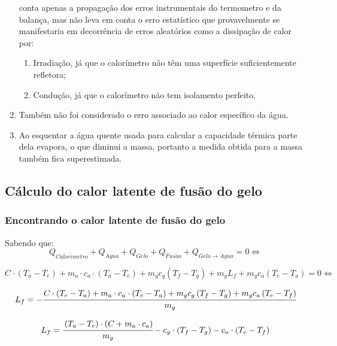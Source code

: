 \documentclass[a4paper]{article}
\begin{document}
\begin{enumerate}
					conta apenas a propagação dos erros instrumentais do termometro e
					da balança, mas não leva em conta o erro estatístico que provavelmente
					se manifestaria em decorrência de erros aleatórios como a dissipação
					de calor por: 
						\begin{enumerate}
							\item Irradiação, já que o calorímetro não têm uma superfície suficientemente
							refletora; 
							\item Condução, já que o calorímetro não tem isolamento perfeito. 
						\end{enumerate}
					\item Também não foi considerado o erro associado ao calor específico da
					água. 
					\item Ao esquentar a água quente usada para calcular a capacidade térmica
					parte dela evapora, o que diminui a massa, portanto a medida obtida
					para a massa também fica superestimada. 
				\end{enumerate}

		\subsection{Cálculo do calor latente de fusão do gelo}

			\subsubsection{Encontrando o calor latente de fusão do gelo}

				Sabendo que: 
				\begin{equation}
					Q_{Calor\acute{i}metro}+
					Q_{\acute{A}gua}+Q_{Gelo}+
					Q_{Fus\tilde{a}o}+Q_{Gelo\rightarrow\acute{A}gua}=0 
					\Leftrightarrow
				\end{equation}


				\[
					C\cdot\left(T_{a}-T_{e}\right)+
					m_{a}\cdot c_{a}\cdot\left(T_{a}-T_{e}\right)+
					m_{g}c_{g}\left(T_{f}-T_{g}\right)+m_{g}L_{f}+
					m_{g}c_{a}\left(T_{e}-T_{a}\right)=0
					\Leftrightarrow
				\]


				\[
					L_{f} = - \cfrac{
										C\cdot\left(T_{e}-T_{a}\right)+
										m_{a}\cdot c_{a}\cdot\left(T_{e}-T_{a}\right)+
										m_{g}c_{g}\left(T_{f}-T_{g}\right)+
										m_{g}c_{a}\left(T_{e}-T_{f}\right)
									}
									{m_{g}}
				\]


				\begin{equation}
					L_{f} = \cfrac{\left(T_{a}-T_{e}\right)\cdot\left(C+m_{a}\cdot c_{a}\right)}{m_{g}}-c_{g}\cdot\left(T_{f}-T_{g}\right)-c_{a}\cdot\left(T_{e}-T_{f}\right)
				\end{equation}
\end{document}
